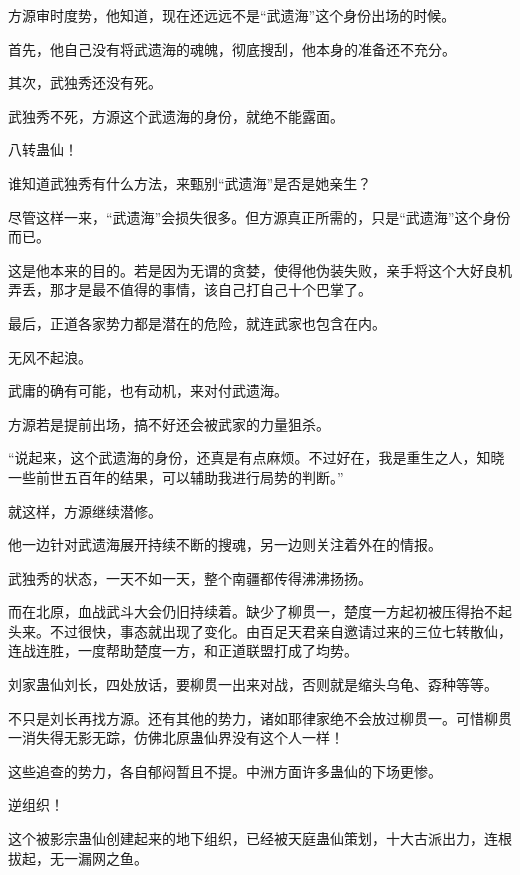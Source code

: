 
\begin{this_body}

方源审时度势，他知道，现在还远远不是“武遗海”这个身份出场的时候。

首先，他自己没有将武遗海的魂魄，彻底搜刮，他本身的准备还不充分。

其次，武独秀还没有死。

武独秀不死，方源这个武遗海的身份，就绝不能露面。

八转蛊仙！

谁知道武独秀有什么方法，来甄别“武遗海”是否是她亲生？

尽管这样一来，“武遗海”会损失很多。但方源真正所需的，只是“武遗海”这个身份而已。

这是他本来的目的。若是因为无谓的贪婪，使得他伪装失败，亲手将这个大好良机弄丢，那才是最不值得的事情，该自己打自己十个巴掌了。

最后，正道各家势力都是潜在的危险，就连武家也包含在内。

无风不起浪。

武庸的确有可能，也有动机，来对付武遗海。

方源若是提前出场，搞不好还会被武家的力量狙杀。

“说起来，这个武遗海的身份，还真是有点麻烦。不过好在，我是重生之人，知晓一些前世五百年的结果，可以辅助我进行局势的判断。”

就这样，方源继续潜修。

他一边针对武遗海展开持续不断的搜魂，另一边则关注着外在的情报。

武独秀的状态，一天不如一天，整个南疆都传得沸沸扬扬。

而在北原，血战武斗大会仍旧持续着。缺少了柳贯一，楚度一方起初被压得抬不起头来。不过很快，事态就出现了变化。由百足天君亲自邀请过来的三位七转散仙，连战连胜，一度帮助楚度一方，和正道联盟打成了均势。

刘家蛊仙刘长，四处放话，要柳贯一出来对战，否则就是缩头乌龟、孬种等等。

不只是刘长再找方源。还有其他的势力，诸如耶律家绝不会放过柳贯一。可惜柳贯一消失得无影无踪，仿佛北原蛊仙界没有这个人一样！

这些追查的势力，各自郁闷暂且不提。中洲方面许多蛊仙的下场更惨。

逆组织！

这个被影宗蛊仙创建起来的地下组织，已经被天庭蛊仙策划，十大古派出力，连根拔起，无一漏网之鱼。


\end{this_body}
